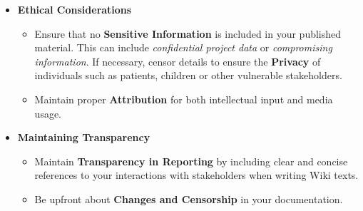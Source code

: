 \begin{itemize}
\begin{itemize}
    \item Keep track of the \textbf{Implementation of Advice and Input} you received to be able to cross-reference from you Integrated Human Practice to other aspects of your project.
    \end{itemize}
    \item \textbf{Ethical Considerations}
    \begin{itemize}
        \item Ensure that no \textbf{Sensitive Information} is included in your published material.
        This can include \textit{confidential project data} or \textit{compromising information}.
        If necessary, censor details to ensure the \textbf{Privacy} of individuals such as patients, children or other vulnerable stakeholders.
        \item Maintain proper \textbf{Attribution} for both intellectual input and media usage.
    \end{itemize}
    \item \textbf{Maintaining Transparency}
    \begin{itemize}
        \item Maintain \textbf{Transparency in Reporting} by including clear and concise references to your interactions with stakeholders when writing Wiki texts.
        \item Be upfront about \textbf{Changes and Censorship} in your documentation.
    \end{itemize}
\end{itemize}
